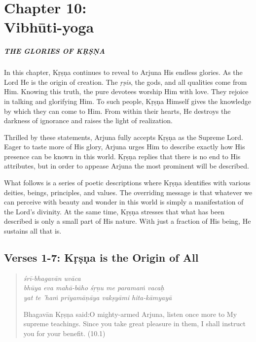 \documentclass[12pt, twoside, openright]{memoir}
\begin{document}
 \chapter{Chapter 10: \\Vibhūti-yoga}\label{chap-vibhuti-yoga}

\paragraph*{\MakeUppercase{The Glories of Kṛṣṇa}}


\noindent In this chapter, Kṛṣṇa continues to reveal to Arjuna His endless glories. As the Lord He is the origin of creation. The \textit{ṛṣis}, the gods, and all qualities come from Him. Knowing this truth, the pure devotees worship Him with love. They rejoice in talking and glorifying Him. To such people, Kṛṣṇa Himself gives the knowledge by which they can come to Him. From within their hearts, He destroys the darkness of ignorance and raises the light of realization.

Thrilled by these statements, Arjuna fully accepts Kṛṣṇa as the Supreme Lord. Eager to taste more of His glory, Arjuna urges Him to describe exactly how His presence can be known in this world. Kṛṣṇa replies that there is no end to His attributes, but in order to appease Arjuna the most prominent will be described.

What follows is a series of poetic descriptions where Kṛṣṇa identifies with various deities, beings, principles, and values. The overriding message is that whatever we can perceive with beauty and wonder in this world is simply a manifestation of the Lord’s divinity. At the same time, Kṛṣṇa stresses that what has been described is only a small part of His nature. With just a fraction of His being, He sustains all that is.

\section{Verses 1-7: Kṛṣṇa is the Origin of All}\label{sec-verses-1-7-krsna-is-the-origin-of-all}


\par
\begin{verse}
\textit{śrī-bhagavān uvāca} \\
\textit{bhūya eva mahā-bāho śṛṇu me paramaṁ vacaḥ} \\
\textit{yat te ’haṁ prīyamāṇāya vakṣyāmi hita-kāmyayā}

\noindent \quad Bhagavān Kṛṣṇa said:\linebreak O mighty-armed Arjuna, listen once more to My supreme teachings. Since you take great pleasure in them, I shall instruct you for your benefit. (10.1)
\end{verse}
\par
\end{document}
